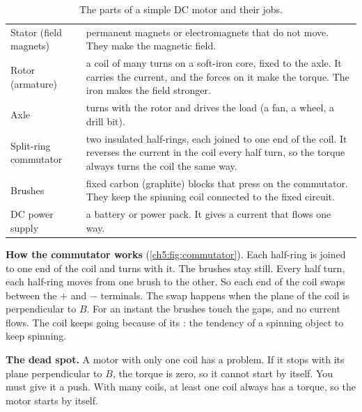 \begin{table}
  \caption{The parts of a simple DC motor and their jobs.}\label{ch5:tab:parts}
  \centering
  \small
  \begin{tabular}{@{}L{36mm}L{102mm}@{}}
    \toprule
     & \\
    \midrule
    Stator (field magnets) & permanent magnets or electromagnets that do not move. They
      make the magnetic field.\\
    Rotor (armature) & a coil of many turns on a soft-iron core, fixed to the axle. It
      carries the current, and the forces on it make the torque. The iron makes the
      field stronger.\\
    Axle & turns with the rotor and drives the load (a fan, a wheel, a drill bit).\\
    Split-ring commutator & two insulated half-rings, each joined to one end of the
      coil. It reverses the current in the coil every half turn, so the torque always
      turns the coil the same way.\\
    Brushes & fixed carbon (graphite) blocks that press on the commutator. They keep the
      spinning coil connected to the fixed circuit.\\
    DC power supply & a battery or power pack. It gives a current that flows one way.\\
    \bottomrule
  \end{tabular}
\end{table}

\textbf{How the commutator works} (\cref{ch5:fig:commutator}). Each half-ring is joined
to one end of the coil and turns with it. The brushes stay still. Every half turn, each
half-ring moves from one brush to the other. So each end of the coil swaps between the
$+$ and $-$ terminals. The swap happens when the plane of the coil is perpendicular to
$B$. For an instant the brushes touch the gaps, and no current flows. The coil keeps
going because of its : the tendency of a spinning object to
keep spinning.

\textbf{The dead spot.} A motor with only one coil has a problem. If it stops with its
plane perpendicular to $B$, the torque is zero, so it cannot start by itself. You must
give it a push. With many coils, at least one coil always has a torque, so the motor
starts by itself.

